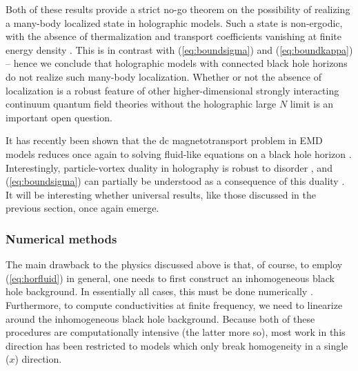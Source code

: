 \documentclass[10pt, oneside]{book}
\begin{document}
\begin{doublespace}
Both of these results provide a strict no-go theorem on the possibility of realizing a many-body localized state in holographic models.   Such a state is non-ergodic, with the absence of thermalization and transport coefficients vanishing at finite energy density \cite{nandkishore}.    This is in contrast with (\ref{eq:boundsigma}) and (\ref{eq:boundkappa}) -- hence we conclude that holographic models with connected black hole horizons do not realize such many-body localization.   Whether or not the absence of localization is a robust feature of other higher-dimensional strongly interacting continuum quantum field theories without the holographic large $N$ limit is an important open question.  


It has recently been shown that the dc magnetotransport problem in EMD models reduces once again to solving fluid-like equations on a black hole horizon  \cite{Donos:2015bxe}.  Interestingly, particle-vortex duality in holography is robust to disorder \cite{Grozdanov:2015qia, Donos:2015bxe}, and (\ref{eq:boundsigma}) can partially be understood as a consequence of this duality \cite{Grozdanov:2015qia}. It will be interesting whether universal results, like those discussed in the previous section, once again emerge.  

\subsubsection{Numerical methods}
The main drawback to the physics discussed above is that, of course, to employ (\ref{eq:horfluid}) in general,  one needs to first construct an inhomogeneous black hole background.  In essentially all cases, this must be done numerically \cite{Dias:2015nua}.    Furthermore, to compute conductivities at finite frequency, we need to linearize around the inhomogeneous black hole background.  Because both of these procedures are computationally intensive (the latter more so), most work in this direction has been restricted to models which only break homogeneity in a single ($x$) direction.


\end{doublespace}
\end{document}
